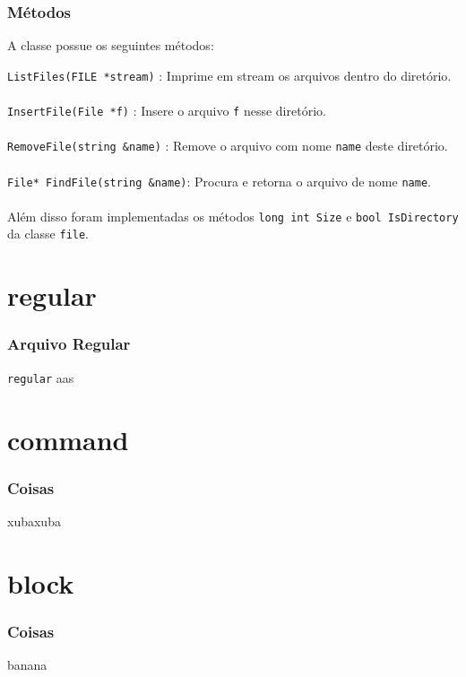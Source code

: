 \documentclass{beamer}
\begin{document}
\begin{frame}
	\frametitle{Métodos}
	A classe possue os seguintes métodos:
	
	\texttt{ListFiles(FILE *stream)}     : Imprime em stream os arquivos dentro do diretório. \\~\\
	\texttt{InsertFile(File *f)}         : Insere o arquivo \texttt{f} nesse diretório.\\~\\
	\texttt{RemoveFile(string &name)}    : Remove o arquivo com nome \texttt{name} deste diretório.\\~\\
	\texttt{File* FindFile(string &name)}: Procura e retorna o arquivo de nome \texttt{name}.\\~\\ 
	
	
	Além disso foram implementadas os métodos \texttt{long int Size} e \texttt{bool IsDirectory} da classe \texttt{file}. 
\end{frame}


\section{regular}

\begin{frame}
  \frametitle{Arquivo Regular}
	\texttt{regular} aas
\end{frame}


\section{command}

\begin{frame}
  \frametitle{Coisas}
xubaxuba
\end{frame}

\section{block}

\begin{frame}
  \frametitle{Coisas}
	banana
\end{frame}
\end{document}
